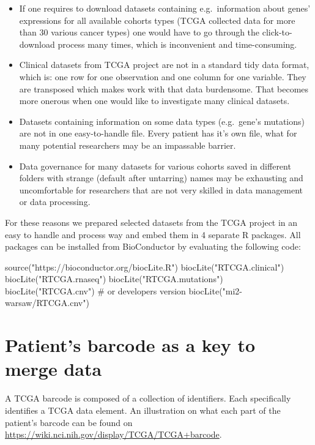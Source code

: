 \begin{itemize}
\itemsep1pt\parskip0pt
\item
  If one requires to download datasets containing e.g.~information about
  genes' expressions for all available cohorts types (TCGA collected
  data for more than 30 various cancer types) one would have to go
  through the click-to-download process many times, which is
  inconvenient and time-consuming.
\item
  Clinical datasets from TCGA project are not in a standard tidy data
  format, which is: one row for one observation and one column for one
  variable. They are transposed which makes work with that data
  burdensome. That becomes more onerous when one would like to
  investigate many clinical datasets.
\item
  Datasets containing information on some data types (e.g.~gene's
  mutations) are not in one easy-to-handle file. Every patient has it's
  own file, what for many potential researchers may be an impassable
  barrier.
\item
  Data governance for many datasets for various cohorts saved in
  different folders with strange (default after untarring) names may be
  exhausting and uncomfortable for researchers that are not very skilled
  in data management or data processing.
\end{itemize}

For these reasons we prepared selected datasets from the TCGA project in
an easy to handle and process way and embed them in 4 separate R
packages. All packages can be installed from BioConductor by evaluating
the following code:

\begin{Schunk}
\begin{Sinput}
source("https://bioconductor.org/biocLite.R")
biocLite("RTCGA.clinical") 
biocLite("RTCGA.rnaseq") 
biocLite("RTCGA.mutations") 
biocLite("RTCGA.cnv") # or developers version biocLite("mi2-warsaw/RTCGA.cnv")
\end{Sinput}
\end{Schunk}

\section{Patient's barcode as a key to merge
data}\label{patients-barcode-as-a-key-to-merge-data}

A TCGA barcode is composed of a collection of identifiers. Each
specifically identifies a TCGA data element. An illustration on what
each part of the patient's barcode can be found on \newline ~
\href{https://wiki.nci.nih.gov/display/TCGA/TCGA+barcode}{\url{https://wiki.nci.nih.gov/display/TCGA/TCGA+barcode}}.

